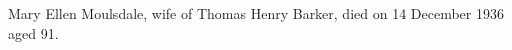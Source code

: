 
Mary Ellen Moulsdale, wife of Thomas Henry Barker, died on 14 December 1936 aged 91.\cite{ToxtethBarker20}

